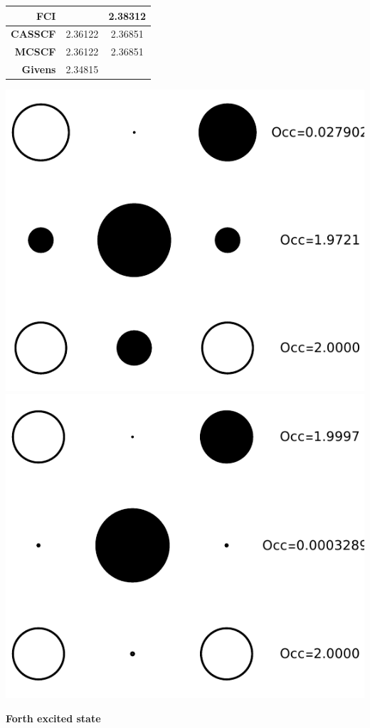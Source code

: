 \documentclass[11pt,a4paper]{article}
\begin{document}
\begin{minipage}{0.3\textwidth}
  \centering
  \begin{tabular}{r|c c}
    \textbf{FCI} &  & 2.38312 \\
    \hline
    \textbf{CASSCF} & 2.36122 & 2.36851 \\
    \hline
    \textbf{MCSCF} & 2.36122 & 2.36851 \\
    \hline
    \textbf{Givens} & 2.34815 & 
  \end{tabular}
\end{minipage}
\hfill
\begin{minipage}{0.6\textwidth}
  \centering
  \includegraphics[width=0.49\linewidth]{Figures/H3_ES3_1_NO}
  \includegraphics[width=0.49\linewidth]{Figures/H3_ES3_2_NO}
  \label{fig:H3_ES3_NO}
\end{minipage}

\textbf{Forth excited state}
\end{document}

